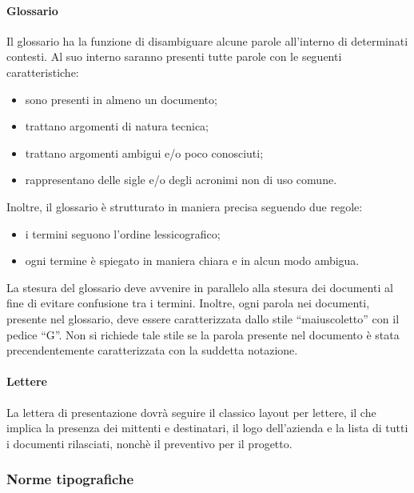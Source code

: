 			\paragraph{Glossario}
				Il glossario ha la funzione di disambiguare alcune parole all'interno di determinati contesti. Al suo interno saranno presenti tutte parole con le seguenti caratteristiche:
				\begin{itemize}
					\item sono presenti in almeno un documento;
					\item trattano argomenti di natura tecnica;
					\item trattano argomenti ambigui e/o poco conosciuti;
					\item rappresentano delle sigle e/o degli acronimi non di uso comune.
				\end{itemize}
				Inoltre, il glossario è strutturato in maniera precisa seguendo due regole:
				\begin{itemize}
					\item i termini seguono l'ordine lessicografico;
					\item ogni termine è spiegato in maniera chiara e in alcun modo ambigua.
				\end{itemize}
				La stesura del glossario deve avvenire in parallelo alla stesura dei documenti al fine di evitare confusione tra i termini. Inoltre, ogni parola nei documenti, presente nel glossario, deve essere caratterizzata dallo stile ``maiuscoletto'' con il pedice ``G''. Non si richiede tale stile se la parola presente nel documento è stata precendentemente caratterizzata con la suddetta notazione.
			\paragraph{Lettere}
				La lettera di presentazione dovrà seguire il classico layout per lettere, il che implica la presenza dei mittenti e destinatari, il logo dell'azienda e la lista di tutti i documenti rilasciati, nonchè il preventivo per il progetto.
		\subsubsection{Norme tipografiche}
